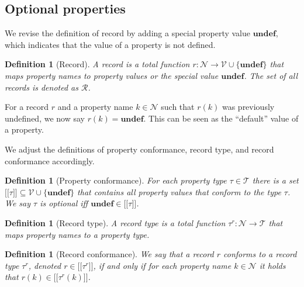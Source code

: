 \documentclass[a4paper]{article}
\newtheorem{definition}[theorem]{Definition}
\newcommand{\ptype}{\tau}
\newcommand{\ptypes}{\mathcal{T}}
\newcommand{\rtype}{\tau^r}
\newcommand{\lsem}{\ensuremath{[\![}}
\newcommand{\rsem}{\ensuremath{]\!]}}
\newcommand{\sem}[1]{\ensuremath{\lsem #1 \rsem}}
\newcommand{\undefined}{\mathbf{undef}}
\begin{document}
\subsection{Optional properties}

We revise the definition of record by adding a special property value $\undefined$, which indicates that the value of a property is not defined.

\begin{definition}[Record]
  A \emph{record} is a total function $r : \mathcal{N} \to \mathcal{V} \cup \{\undefined\}$ that maps property names to property values or the special value $\undefined$. The set of all records is denoted as $\mathcal{R}$.
\end{definition}

For a record $r$ and a property name $k \in \mathcal{N}$ such that $r(k)$ was previously undefined, we now say $r(k) = \undefined$. This can be seen as the ``default'' value of a property.

We adjust the definitions of property conformance, record type, and record conformance accordingly.

\begin{definition}[Property conformance]
  For each property type $\ptype \in \ptypes$ there is a set $\sem{\ptype} \subseteq \mathcal{V} \cup \{\undefined\}$ that contains all property values that \emph{conform} to the type $\ptype$. We say $\ptype$ is \emph{optional} iff $\undefined \in \sem{\ptype}$.
\end{definition}

\begin{definition}[Record type]
  A \emph{record type} is a total function $\rtype : \mathcal{N} \to \ptypes$ that maps property names to a property type.
\end{definition}

\begin{definition}[Record conformance]
  We say that a record $r$ \emph{conforms} to a record type $\rtype$, denoted $r \in \sem{\rtype}$, if and only if for each property name $k \in \mathcal{N}$ it holds that $r(k) \in \sem{\rtype(k)}$.
\end{definition}


\end{document}
